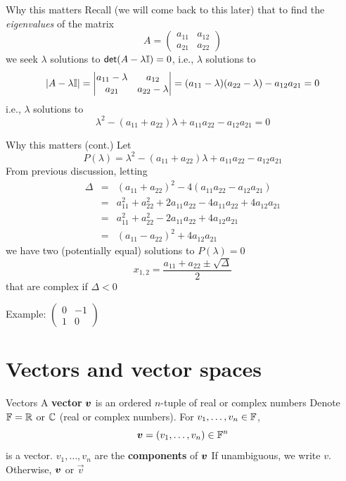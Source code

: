 \documentclass[aspectratio=169]{beamer}\usepackage[]{graphicx}\usepackage[]{xcolor}
\begin{document}
\begin{frame}{Why this matters}
Recall (we will come back to this later) that to find the \emph{eigenvalues} of the matrix
\[
A=
\begin{pmatrix}
a_{11} & a_{12} \\ a_{21} & a_{22}
\end{pmatrix}
\]
we seek $\lambda$ solutions to $\mathsf{det}(A-\lambda\mathbb{I})=0$, i.e., $\lambda$ solutions to
\[
|A-\lambda\mathbb{I}|
=\left|
\begin{matrix}
a_{11}-\lambda & a_{12} \\ a_{21} & a_{22}-\lambda
\end{matrix}
\right|
=(a_{11}-\lambda)(a_{22}-\lambda)-a_{12}a_{21}=0
\]
i.e., $\lambda$ solutions to
\[
\lambda^2 - (a_{11}+a_{22})\lambda + a_{11}a_{22}-a_{12}a_{21} = 0
\]
\end{frame}

\begin{frame}{Why this matters (cont.)}
Let
\[
P(\lambda) = \lambda^2 - (a_{11}+a_{22})\lambda + a_{11}a_{22}-a_{12}a_{21}
\]
From previous discussion, letting 
\[
\begin{matrix} 
\Delta &=& (a_{11}+a_{22})^2-4(a_{11}a_{22}-a_{12}a_{21}) \\
&=& a_{11}^2+a_{22}^2+2a_{11}a_{22}
-4a_{11}a_{22}+4a_{12}a_{21} \\
&=& a_{11}^2+a_{22}^2-2a_{11}a_{22}
+4a_{12}a_{21} \\
&=& (a_{11}-a_{22})^2+4a_{12}a_{21}
\end{matrix}
\]
we have two (potentially equal) solutions to $P(\lambda)=0$
\[
x_{1,2} = \frac{a_{11}+a_{22}\pm \sqrt{\Delta}}{2}
\]
that are complex if $\Delta<0$

Example:
$\begin{pmatrix}
0 & -1 \\ 1 & 0
\end{pmatrix}$

\end{frame}

\section{Vectors and vector spaces}

\begin{frame}{Vectors}
	A \textbf{vector} $\bm{v}$ is an ordered $n$-tuple of real or complex numbers
	\vfill 
	Denote $\mathbb{F}=\mathbb{R}$ or $\mathbb{C}$ (real or complex numbers). 
	For
	$v_1,\ldots,v_n\in\mathbb{F}$, 
	\[
	\bm{v}=(v_1,\ldots,v_n)\in\mathbb{F}^n
	\]
	is a vector. $v_1,\ldots,v_n$ are the \textbf{components} of $\bm{v}$
	\vfill
	If unambiguous, we write $v$. Otherwise, $\bm{v}$ or $\vec{v}$
\end{frame}
\end{document}
